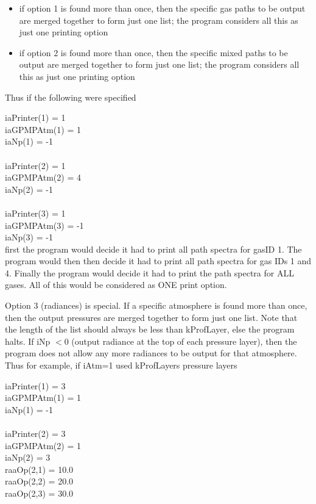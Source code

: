 \documentclass[12pt]{article}
\newcommand{\ttab}{\indent\indent}
\begin{document}
{{{\begin{itemize}
\item if option 1 is found more than once, then the specific gas
  paths to be output are merged together to form just one list; the
  program considers all this as just one printing option

\item if option 2 is found more than once, then the specific mixed
  paths to be output are merged together to form just one list; the
  program considers all this as just one printing option
\end{itemize}

\noindent
Thus if the following were specified

\medskip
\ttab iaPrinter(1) = 1\\
\ttab  iaGPMPAtm(1) = 1\\
\ttab  iaNp(1) = -1\\
\ttab \\
\ttab iaPrinter(2) = 1\\
\ttab  iaGPMPAtm(2) = 4\\
\ttab  iaNp(2) = -1\\
\ttab \\
\ttab iaPrinter(3) = 1\\
\ttab  iaGPMPAtm(3) = -1\\
\ttab  iaNp(3) = -1\\

\medskip\noindent
first the program would decide it had to print all path spectra for
gasID 1.  The program would then then decide it had to print all
path spectra for gas IDs 1 and 4.  Finally the program would decide
it had to print the path spectra for ALL gases.  All of this would
be considered as ONE print option.

Option 3 (radiances) is special.  If a specific atmosphere is found
more than once, then the output pressures are merged together to
form just one list.  Note that the length of the list should always
be less than kProfLayer, else the program halts.  If
iNp $< 0$ (output radiance at the top of each pressure layer), then
the program does not allow any more radiances to be output for that
atmosphere.  Thus for example, if iAtm=1 used kProfLayers pressure layers

\medskip
\ttab iaPrinter(1) = 3\\
\ttab  iaGPMPAtm(1) = 1\\
\ttab  iaNp(1) = -1\\
\ttab \\
\ttab iaPrinter(2) = 3\\
\ttab  iaGPMPAtm(2) = 1\\
\ttab  iaNp(2) = 3\\
\ttab  raaOp(2,1) = 10.0 \\
\ttab  raaOp(2,2) = 20.0 \\
\ttab  raaOp(2,3) = 30.0 \\

}}}
\end{document}
